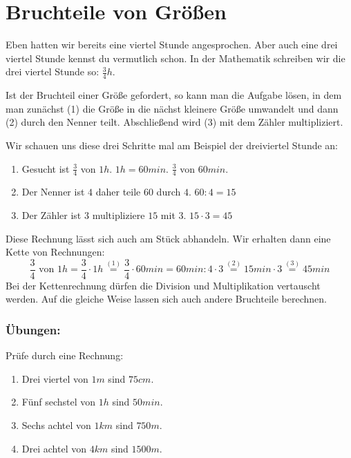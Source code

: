\section{Bruchteile von Größen\label{sec:bruchteile}}\vspace{-1em}
Eben hatten wir bereits eine viertel Stunde angesprochen. Aber auch eine drei viertel Stunde kennst du vermutlich schon. In der Mathematik schreiben wir die drei viertel Stunde so: $\frac{3}{4}h$. 

Ist der Bruchteil einer Größe gefordert, so kann man die Aufgabe lösen, in dem man zunächst (1) die Größe in die nächst kleinere Größe umwandelt und dann (2) durch den Nenner teilt. Abschließend wird (3) mit dem Zähler multipliziert.

Wir schauen uns diese drei Schritte mal am Beispiel der dreiviertel Stunde an:
\begin{enumerate}
	\item Gesucht ist $\frac{3}{4}$ von $1h$. $1h=60min$. \hfill $\frac{3}{4}$ von $60min$.
	\item Der Nenner ist $4$ daher teile $60$ durch $4$. \hfill $60:4=15$
	\item Der Zähler ist $3$ multipliziere $15$ mit $3$. \hfill $15\cdot 3 = 45$
\end{enumerate}

Diese Rechnung lässt sich auch am Stück abhandeln. Wir erhalten dann eine Kette von Rechnungen:
\begin{equation*}
	\frac{3}{4}\text{ von }1h=\frac{3}{4}\cdot 1h \overset{(1)}{=} \frac{3}{4}\cdot 60min = 60min : 4 \cdot 3 \overset{(2)}{=} 15 min \cdot 3 \overset{(3)}{=} 45 min
\end{equation*}
Bei der Kettenrechnung dürfen die Division und Multiplikation vertauscht werden. 
Auf die gleiche Weise lassen sich auch andere Bruchteile berechnen.

\subsubsection*{Übungen:}\vspace{-1em}
Prüfe durch eine Rechnung:
\begin{enumerate}[label=\alph*)]
	\item Drei viertel von $1m$ sind $75cm$.
	\item Fünf sechstel von $1h$ sind $50min$.
	\item Sechs achtel von $1km$ sind $750m$.
	\item Drei achtel von $4km$ sind $1500m$.
\end{enumerate}
